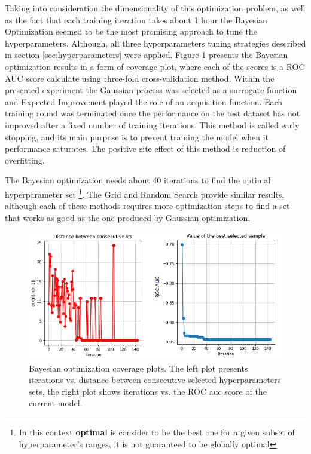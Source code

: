 Taking into consideration the dimensionality of this optimization problem, as well as the fact that each training iteration takes about 1 hour the Bayesian Optimization seemed to be the most promising approach to tune the hyperparameters. Although, all three hyperparameters tuning strategies described in section \ref{sec:hyperparameters} were applied. Figure \ref{fig:hyperparameter_xgboost} presents the Bayesian optimization results in a form of coverage plot, where each of the scores is a ROC AUC score calculate using three-fold cross-validation method. Within the presented experiment the Gaussian process was selected as a surrogate function and Expected Improvement played the role of an acquisition function. Each training round was terminated once the performance on the test dataset has not improved after a fixed number of training iterations. This method is called early stopping, and its main purpose is to prevent training the model when it performance saturates. The positive site effect of this method is reduction of overfitting. 

The Bayesian optimization needs about 40 iterations to find the optimal hyperparameter set \footnote{In this context \textbf{optimal} is consider to be the best one for a given subset of hyperparameter's ranges, it is not guaranteed to be globally optimal}. The Grid and Random Search provide similar results, although each of these methods requires more optimization steps to find a set that works as good as the one produced by Gaussian optimization. 

\begin{figure}
\centering
\hspace*{-1cm}\includegraphics{figures/GaussianOptXgboost.png}
\caption{Bayesian optimization coverage plots. The left plot presents iterations vs. distance between consecutive selected hyperparameters sets, the right plot shows iterations vs. the ROC auc score of the current model.}
\label{fig:hyperparameter_xgboost}
\end{figure}

